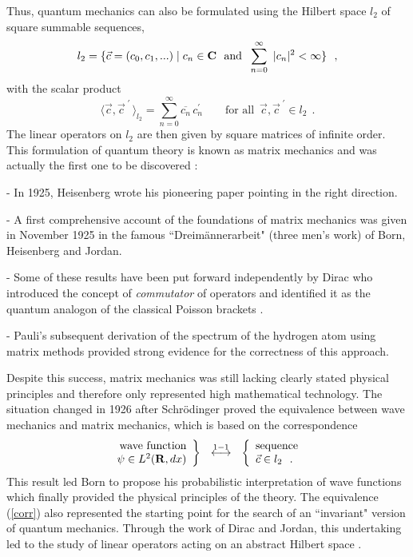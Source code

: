 \documentclass[a4wide,12pt]{report}
\begin{document}
Thus, quantum mechanics can also  be formulated 
using the Hilbert space $l_2$ 
of square summable sequences,  
$$
l_2 = \{ \vec{c} = (c_0, c_1, ...) \mid c_n \in {\bf C}
\ \ {\rm and} \ \; \sum_{n=0}^{\infty} \ | c_n | ^2 < \infty \}
\ \ ,
$$
with the scalar product 
$$
\langle \vec c , \vec c ^{\; \prime} \, \rangle _{l_2} 
= \sum_{n=0} ^{\infty}
\overline{c_n} \, c^{\prime} _n
\qquad \mbox{for all} \ \; 
\vec{c}, \vec c ^{\; \prime} \in l_2 
\ \ .
$$
The linear operators on $l_2$ are then given 
by square matrices of infinite order.
This formulation of quantum theory is known as matrix mechanics
and was actually the first one to be discovered 
\cite{pais, kragh, moore}:

- In 1925, Heisenberg wrote his pioneering paper pointing 
in the right direction. 

- A first comprehensive account
of the foundations of matrix mechanics 
was given in November 1925 in the famous ``Dreim\"annerarbeit"
(three men's work) of Born, Heisenberg and Jordan. 

- Some of these results have been put forward    
independently by Dirac 
who introduced the 
concept of 
{\em commutator} of operators 
and identified it as the quantum analogon 
of the classical Poisson brackets \cite{wig}. 
 
- Pauli's subsequent derivation of the 
spectrum of the hydrogen atom using matrix methods  
provided strong evidence for the correctness of this approach.  

Despite this success, matrix mechanics
was still lacking clearly stated physical 
principles and therefore only represented high
mathematical technology. 
The situation changed in 1926 after Schr\"odinger
proved the equivalence between wave mechanics and 
matrix mechanics, which is 
based on the correspondence
\begin{equation}
\label{corr}
\left.
\begin{array}{r}
\mbox{wave function}
\\
 \psi \in \lt 
\end{array}
\right\}
 \ \ \stackrel{{\rm 1-1}}{\longleftrightarrow}
\ \ 
\left\{
\begin{array}{l}
\mbox{sequence}
\\
\vec c \in l_2  
\ \ .
\end{array}
\right.
\end{equation}
This result 
led Born to propose his probabilistic interpretation 
of wave functions 
which finally provided the physical principles 
of the theory. 
The equivalence (\ref{corr}) also 
represented the starting point for the search of an ``invariant"
version of quantum mechanics. Through the work of Dirac and Jordan,
this undertaking led to the study of linear operators acting on
an abstract Hilbert space \cite{fh}\cite{jvn,stone}.
\end{document}
